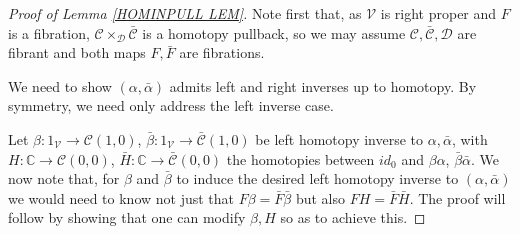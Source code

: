 \documentclass[a4paper,10pt
,draft
]{article}%
\numberwithin{equation}{section}
\numberwithin{figure}{section}
\theoremstyle{definition} %
\newcommand{\V}{\ensuremath{\mathcal V}}
\newcommand{\1}{\ensuremath{\mathbbm 1}}%
\begin{document}
\begin{proof}[Proof of Lemma \ref{HOMINPULL LEM}]
Note first that, as $\V$ is right proper and $F$ is a fibration,
$\mathcal{C} \times_{\mathcal{D}}\bar{\mathcal{C}}$
is a homotopy pullback,
so we may assume
$\mathcal{C},\bar{\mathcal{C}},\mathcal{D}$
are fibrant and both maps $F,\bar{F}$ are fibrations.

We need to show $(\alpha,\bar{\alpha})$
admits left and right inverses up to homotopy.
By symmetry, we need only address the left inverse case.

Let
$\beta \colon 1_{\V} \to \mathcal{C}(1,0)$,
$\bar{\beta} \colon 1_{\V} \to \bar{\mathcal{C}}(1,0)$
be left homotopy inverse to $\alpha,\bar{\alpha}$,
with 
$H \colon \mathbb{C} \to \mathcal{C}(0,0)$,
$\bar{H} \colon \mathbb{C} \to \bar{\mathcal{C}}(0,0)$
the homotopies between 
$id_0$ and $\beta\alpha$, $\bar{\beta}\bar{\alpha}$.
We now note that, for $\beta$ and $\bar{\beta}$ to induce the desired 
left homotopy inverse to 
$(\alpha,\bar{\alpha})$
we would need to know not just that 
$F\beta=\bar{F}\bar{\beta}$
but also 
$FH=\bar{F}\bar{H}$.
The proof will follow by showing that one can modify 
$\beta,H$ so as to achieve this.


\end{proof}
\end{document}
